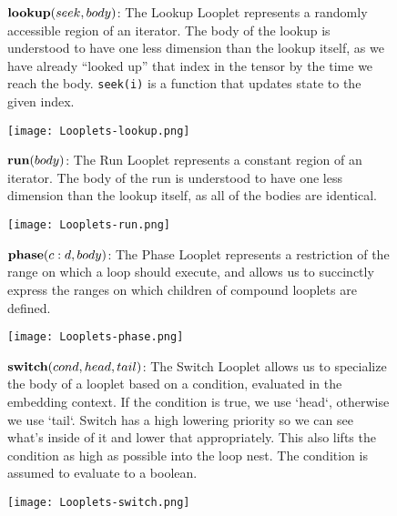 \begin{figure}[ht]
    \footnotesize
    \begin{minipage}[c]{0.65\linewidth}
        $\text{\textbf{lookup}}(seek, body)$: The Lookup Looplet represents a
        randomly accessible region of an iterator. The body of the lookup is
        understood to have one less dimension than the lookup itself, as we have
        already ``looked up'' that index in the tensor by the time we reach the
        body. \texttt{seek(i)} is a function that updates state to the given
        index.
    \end{minipage}%
    \begin{minipage}[c]{0.35\linewidth}
        \centering
        \texttt{[image: Looplets-lookup.png]}
    \end{minipage}
    \vspace{3pt}

    \begin{minipage}[c]{0.65\linewidth}
        $\text{\textbf{run}}(body)$: The Run Looplet represents a constant
        region of an iterator. The body of the run is understood to have one
        less dimension than the lookup itself, as all of the bodies are
        identical.
    \end{minipage}%
    \begin{minipage}[c]{0.35\linewidth}
        \centering
        \texttt{[image: Looplets-run.png]}
    \end{minipage}
    \vspace{3pt}

    \begin{minipage}[c]{0.65\linewidth}
        $\text{\textbf{phase}}(c:d, body)$: The Phase Looplet represents a
        restriction of the range on which a loop should execute, and allows us
        to succinctly express the ranges on which children of compound looplets
        are defined.
    \end{minipage}%
    \begin{minipage}[c]{0.35\linewidth}
        \centering
        \texttt{[image: Looplets-phase.png]}
    \end{minipage}
    \vspace{3pt}

    \begin{minipage}[c]{0.65\linewidth}
        $\text{\textbf{switch}}(cond, head, tail)$: The Switch Looplet allows
        us to specialize the body of a looplet based on a condition, evaluated
        in the embedding context. If the condition is true, we use `head`,
        otherwise we use `tail`. Switch has a high lowering priority so we can
        see what's inside of it and lower that appropriately. This also lifts
        the condition as high as possible into the loop nest. The condition is
        assumed to evaluate to a boolean.
    \end{minipage}%
    \begin{minipage}[c]{0.35\linewidth}
        \centering
        \texttt{[image: Looplets-switch.png]}
    \end{minipage}
    \vspace{3pt}


\end{figure}
